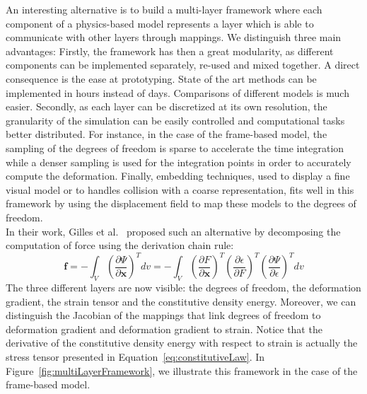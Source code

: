 An interesting alternative is to build a multi-layer framework where each component of a physics-based model represents a layer which is able to communicate with other layers through mappings. 
We distinguish three main advantages:
Firstly, the framework has then a great modularity, as different components can be implemented separately, re-used and mixed together. A direct consequence is the ease at prototyping. 
State of the art methods can be implemented in hours instead of days. 
Comparisons of different models is much easier. 
Secondly, as each layer can be discretized at its own resolution, the granularity of the simulation can be easily controlled and computational tasks better distributed.
For instance, in the case of the frame-based model, the sampling of the degrees of freedom is sparse to accelerate the time integration while a denser sampling is used for the integration points in order to accurately compute the deformation.
Finally, embedding techniques, used to display a fine visual model or to handles collision with a coarse representation, fits well in this framework by using the displacement field to map these models to the degrees of freedom.
\\
In their work, Gilles et al.~\cite{Gilles2011} proposed such an alternative by decomposing the computation of force using the derivation chain rule:
\begin{equation}
\label{eq:forceChainRule}
\displaystyle \mathbf{f} = -\int_{V} \left(\frac{\partial \Psi}{\partial \mathbf{x}}\right)^{T} dv
=
-\int_{V} \left(\frac{\partial F}{\partial \mathbf{x}}\right)^{T}
\left(\frac{\partial \epsilon}{\partial F}\right)^{T}
\left(\frac{\partial \Psi}{\partial \epsilon}\right)^{T} dv
\end{equation}
The three different layers are now visible: the degrees of freedom, the deformation gradient, the strain tensor and the constitutive density energy.
Moreover, we can distinguish the Jacobian of the mappings that link degrees of freedom to deformation gradient and deformation gradient to strain.
Notice that the derivative of the constitutive density energy with respect to strain is actually the stress tensor presented in Equation~\eqref{eq:constitutiveLaw}.
In Figure~\ref{fig:multiLayerFramework}, we illustrate this framework in the case of the frame-based model.
